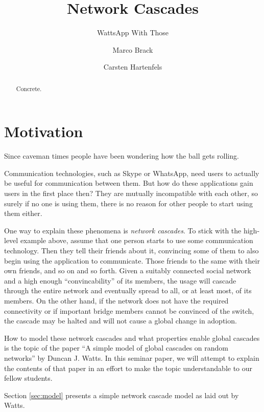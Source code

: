 \documentclass{sig-alternate-05-2015}
\begin{document}
\title{Network Cascades}
\subtitle{WattsApp With Those}
\author{Marco Brack \and Carsten Hartenfels}
\maketitle


\begin{abstract}
Concrete.
\end{abstract}


\section{Motivation}\label{sec:motivation}

Since caveman times people have been wondering how the ball gets rolling.

Communication technologies, such as Skype or WhatsApp, need users to actually be useful for communication between them. But how do these applications gain users in the first place then? They are mutually incompatible with each other, so surely if no one is using them, there is no reason for other people to start using them either.

One way to explain these phenomena is \emph{network cascades}. To stick with the high-level example above, assume that one person starts to use some communication technology. Then they tell their friends about it, convincing some of them to also begin using the application to communicate. Those friends to the same with their own friends, and so on and so forth. Given a suitably connected social network and a high enough ``convincability'' of its members, the usage will cascade through the entire network and eventually spread to all, or at least most, of its members. On the other hand, if the network does not have the required connectivity or if important bridge members cannot be convinced of the switch, the cascade may be halted and will not cause a global change in adoption.


How to model these network cascades and what properties enable global cascades is the topic of the paper ``A simple model of global cascades on random networks'' by Duncan J. Watts\cite{simplemodel}. In this seminar paper, we will attempt to explain the contents of that paper in an effort to make the topic understandable to our fellow students.


\par\bigskip

Section \ref{sec:model} presents a simple network cascade model as laid out by Watts\cite{simplemodel}.
\end{document}
